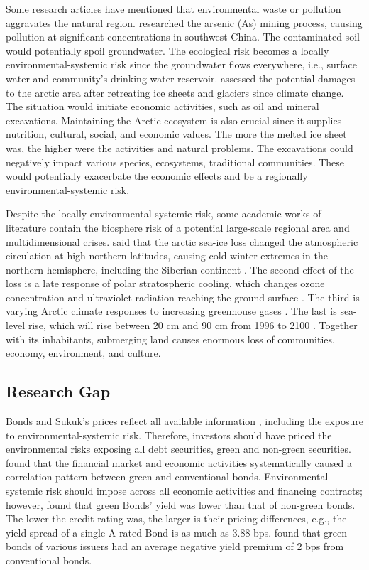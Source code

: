 \documentclass[sn-basic]{sn-jnl}%
\theoremstyle{thmstyleone}%
\theoremstyle{thmstyletwo}%
\theoremstyle{thmstylethree}%
\begin{document}
Some research articles have mentioned that environmental waste or pollution aggravates the natural region. \citet{liu2020soil} researched the arsenic (As) mining process, causing pollution at significant concentrations in southwest China. The contaminated soil would potentially spoil groundwater. The ecological risk becomes a locally environmental-systemic risk since the groundwater flows everywhere, i.e., surface water and community’s drinking water reservoir. \citet{johannsdottir2019systemic} assessed the potential damages to the arctic area after retreating ice sheets and glaciers since climate change. The situation would initiate economic activities, such as oil and mineral excavations. Maintaining the Arctic ecosystem is also crucial since it supplies nutrition, cultural, social, and economic values. The more the melted ice sheet was, the higher were the activities and natural problems. The excavations could negatively impact various species, ecosystems, traditional communities. These would potentially exacerbate the economic effects and be a regionally environmental-systemic risk.

Despite the locally environmental-systemic risk, some academic works of literature contain the biosphere risk of a potential large-scale regional area and multidimensional crises. \citep{tang2013cold} said that the arctic sea-ice loss changed the atmospheric circulation at high northern latitudes, causing cold winter extremes in the northern hemisphere, including the Siberian continent \citep{ogawa2018evaluating}. The second effect of the loss is a late response of polar stratospheric cooling, which changes ozone concentration and ultraviolet radiation reaching the ground surface \citep{screen2013atmospheric}. The third is varying Arctic climate responses to increasing greenhouse gases \citep{screen2013atmospheric}. The last is sea-level rise, which will rise between 20 cm and 90 cm from 1996 to 2100 \citep{yohe1998sea}. Together with its inhabitants, submerging land causes enormous loss of communities, economy, environment, and culture.

\subsection{Research Gap}
Bonds and Sukuk’s prices reflect all available information \citep{malkiel1970efficient}, including the exposure to environmental-systemic risk. Therefore, investors should have priced the environmental risks exposing all debt securities, green and non-green securities. \citet{broadstock2019time} found that the financial market and economic activities systematically caused a correlation pattern between green and conventional bonds. Environmental-systemic risk should impose across all economic activities and financing contracts; however, \citet{hachenberg2018green} found that green Bonds’ yield was lower than that of non-green bonds. The lower the credit rating was, the larger is their pricing differences, e.g., the yield spread of a single A-rated Bond is as much as 3.88 bps. \citet{zerbib2019effect} found that green bonds of various issuers had an average negative yield premium of 2 bps from conventional bonds.
\end{document}
